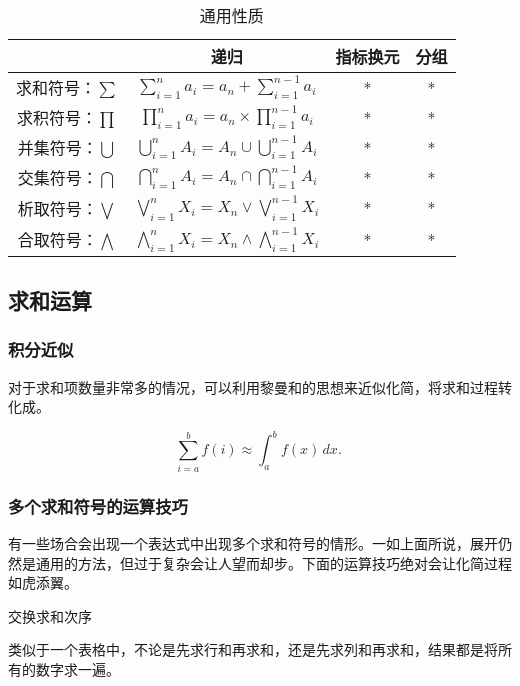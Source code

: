 \begin{table}[ht]
\centering
\caption{通用性质}\label{tab_LgOper1}
\begin{tabular}{|c|c|c|c|}
\hline
 & 递归 & 指标换元 & 分组 \\
\hline
求和符号：$\sum$ & $\displaystyle\sum_{i=1}^n a_i=a_n+ \sum_{i=1}^{n-1}a_i$ & * & * \\
\hline
求积符号：$\prod$& $\displaystyle\prod_{i=1}^n a_i=a_n\times \prod_{i=1}^{n-1}a_i$ & * & * \\
\hline
并集符号：$\bigcup$& $\displaystyle\bigcup_{i=1}^n A_i=A_n\cup \bigcup_{i=1}^{n-1}A_i$  & * & * \\
\hline
交集符号：$\bigcap$ & $\displaystyle\bigcap_{i=1}^n A_i=A_n\cap \bigcap_{i=1}^{n-1}A_i$ & * & * \\
\hline
析取符号：$\bigvee$ & $\displaystyle\bigvee_{i=1}^n X_i=X_n\vee \bigvee_{i=1}^{n-1}X_i$ & * & * \\
\hline
合取符号：$\bigwedge$ &$\displaystyle\bigwedge_{i=1}^n X_i=X_n\wedge \bigwedge_{i=1}^{n-1}X_i$  & * & * \\
\hline
\end{tabular}
\end{table}

\subsection{求和运算}

\subsubsection{积分近似}

对于求和项数量非常多的情况，可以利用黎曼和的思想来近似化简，将求和过程转化成。

\begin{equation}
\sum_{i=a}^b f(i) \approx \int_a^b f(x) \, dx.~
\end{equation}


\subsubsection{多个求和符号的运算技巧}

有一些场合会出现一个表达式中出现多个求和符号的情形。一如上面所说，展开仍然是通用的方法，但过于复杂会让人望而却步。下面的运算技巧绝对会让化简过程如虎添翼。

交换求和次序

类似于一个表格中，不论是先求行和再求和，还是先求列和再求和，结果都是将所有的数字求一遍。

